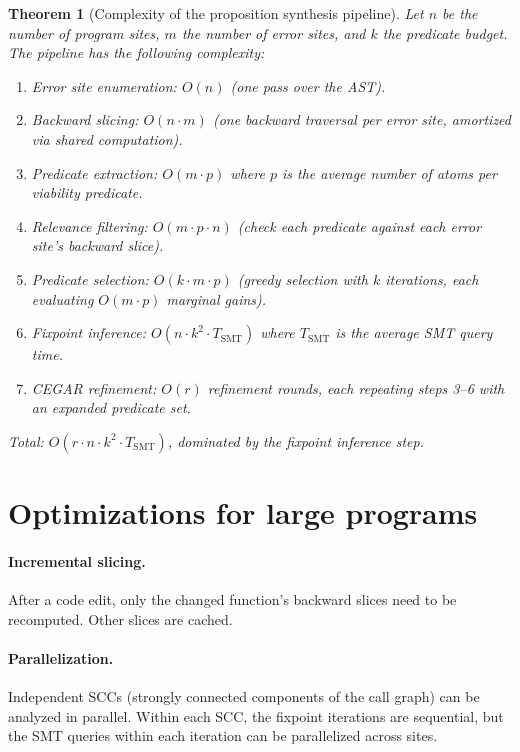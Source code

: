 \documentclass[11pt]{report}
\theoremstyle{definition}
\theoremstyle{plain}
\newtheorem{theorem}[definition]{Theorem}
\begin{document}
\begin{theorem}[Complexity of the proposition synthesis pipeline]
Let $n$ be the number of program sites, $m$ the number of error sites, and
$k$ the predicate budget. The pipeline has the following complexity:
\begin{enumerate}[nosep]
  \item Error site enumeration: $O(n)$ (one pass over the AST).
  \item Backward slicing: $O(n \cdot m)$ (one backward traversal per error
        site, amortized via shared computation).
  \item Predicate extraction: $O(m \cdot p)$ where $p$ is the average number
        of atoms per viability predicate.
  \item Relevance filtering: $O(m \cdot p \cdot n)$ (check each predicate
        against each error site's backward slice).
  \item Predicate selection: $O(k \cdot m \cdot p)$ (greedy selection with
        $k$ iterations, each evaluating $O(m \cdot p)$ marginal gains).
  \item Fixpoint inference: $O(n \cdot k^2 \cdot T_{\mathrm{SMT}})$ where
        $T_{\mathrm{SMT}}$ is the average SMT query time.
  \item CEGAR refinement: $O(r)$ refinement rounds, each repeating steps
        3--6 with an expanded predicate set.
\end{enumerate}
Total: $O(r \cdot n \cdot k^2 \cdot T_{\mathrm{SMT}})$, dominated by the
fixpoint inference step.
\end{theorem}

\section{Optimizations for large programs}

\paragraph{Incremental slicing.}
After a code edit, only the changed function's backward slices need to be
recomputed. Other slices are cached.

\paragraph{Parallelization.}
Independent SCCs (strongly connected components of the call graph) can be
analyzed in parallel. Within each SCC, the fixpoint iterations are sequential,
but the SMT queries within each iteration can be parallelized across sites.
\end{document}
